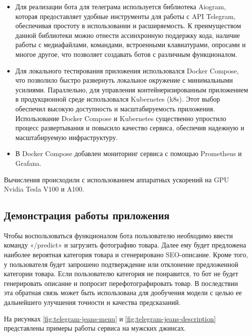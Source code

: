 \documentclass[a4paper,12pt]{extarticle}
\begin{document}
\begin{itemize}
	\item Для реализации бота для телеграма используется библиотека Aiogram\cite{aiogram}, которая предоставляет удобные инструменты для работы с API Telegram, обеспечивая простоту в использовании и расширяемость. К преимуществом данной библиотеки можно отнести ассинхронную поддержку кода, наличие работы с медиафайлами, командами, встроенными клавиатурами, опросами и многое другое, что позволяет создавать ботов с различным функционалом.
	\item Для локального тестирования приложения использовался Docker Compose\cite{docker}, что позволило быстро развернуть локальное окружение с минимальными усилиями. Параллельно, для управления контейнеризированным приложением в продукционной среде использовался Kubernetes (k8s)\cite{kubernetes}. Этот выбор обеспечил высокую доступность и масштабируемость приложения.
	Использование Docker Compose и Kubernetes существенно упростило процесс развертывания и повысило качество сервиса, обеспечив надежную и масштабируемую инфраструктуру.
	\item В Docker Compose добавлен мониторинг сервиса с помощью Prometheus\cite{prometheus} и Grafana\cite{grafana}.
\end{itemize}

Вычисления происходили с использованием аппаратных ускорений на GPU Nvidia Tesla V100 и A100.

\subsection{Демонстрация работы приложения}

Чтобы воспользоваться функционалом бота пользователю необходимо ввести команду «/predict» и загрузить фотографию товара. Далее ему будет предложена наиболее вероятная категория товара и сгенерировано SEO-описание. Кроме того, у пользователя будет запрошено подтверждение или отклонение предложенной категории товара. Если пользователю категория не понравится, то бот не будет генерировать описание и попросит перефотографировать товар. В последствии эта обратная связь может быть использована для дообучения модели с целью ее дальнейшего улучшения точности и качества предсказаний.

На рисунках \ref{fig:telegram-jeans-menu} и \ref{fig:telegram-jeans-description} представлены примеры работы сервиса на мужских джинсах.
\end{document}
